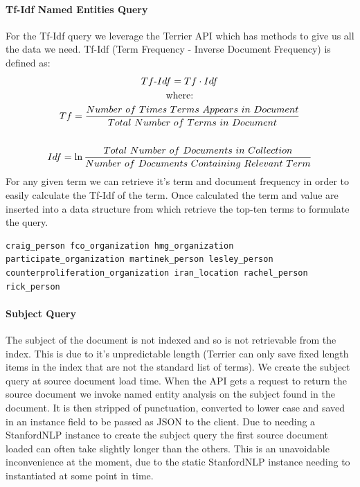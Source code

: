 \documentclass{l4proj}
\newenvironment{codelisting}{\captionsetup{type=listing}}{}
\begin{document}
\paragraph{Tf-Idf Named Entities Query}
For the Tf-Idf query we leverage the Terrier API which has methods to give us all the data we need.
Tf-Idf (Term Frequency - Inverse Document Frequency) is defined as:
\begin{gather*}
Tf\textnormal{-}Idf = Tf \cdot Idf \\
\textnormal{where:} \\ 
Tf = \frac{Number\ of\ Times\ Terms\ Appears\ in\ Document}{Total\ Number\ of\ Terms\ in\ Document} \\ \\
Idf = \ln{\frac{Total\ Number\ of\ Documents\ in\ Collection}{Number\ of\ Documents\ Containing\ Relevant\ Term}}
\end{gather*}
For any given term we can retrieve it's term and document frequency in order to easily calculate the Tf-Idf of the term. Once calculated the term and value are inserted into a data structure from which retrieve the top-ten terms to formulate the query.\\
\begin{codelisting}
\begin{verbatim}
craig_person fco_organization hmg_organization participate_organization martinek_person lesley_person counterproliferation_organization iran_location rachel_person rick_person
\end{verbatim}
\label{code:tf_idf_query}
\end{codelisting}


\paragraph{Subject Query}
The subject of the document is not indexed and so is not retrievable from the index. This is due to it's unpredictable length (Terrier can only save fixed length items in the index that are not the standard list of terms). We create the subject query at source document load time. When the API gets a request to return the source document we invoke named entity analysis on the subject found in the document. It is then stripped of punctuation, converted to lower case and saved in an instance field to be passed as JSON to the client. Due to needing a StanfordNLP instance to create the subject query the first source document loaded can often take slightly longer than the others. This is an unavoidable inconvenience at the moment, due to the static StanfordNLP instance needing to instantiated at some point in time.\\
\end{document}
